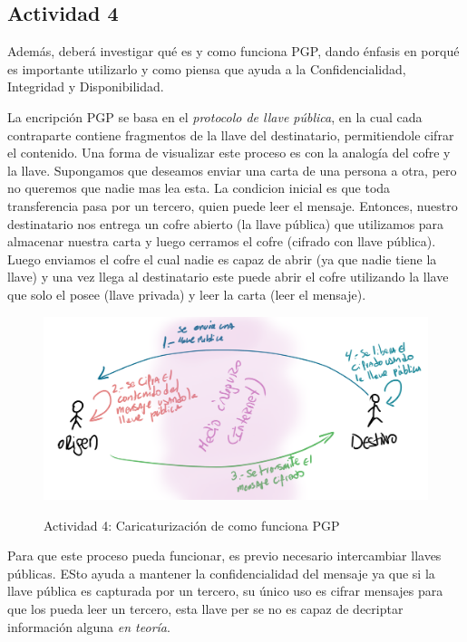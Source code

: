 \documentclass[11pt]{utalcaDoc}
\begin{document}
\subsection{Actividad 4}{Además, deberá investigar qué es y como funciona PGP, dando énfasis en porqué es importante utilizarlo y como piensa que ayuda a la Confidencialidad, Integridad y Disponibilidad.}

La encripción PGP se basa en el \textit{protocolo de llave pública}, en la cual cada contraparte contiene fragmentos de la llave del destinatario, permitiendole cifrar el contenido. Una forma de visualizar este proceso es con la analogía del cofre y la llave. Supongamos que deseamos enviar una carta de una persona a otra, pero no queremos que nadie mas lea esta. La condicion inicial es que toda transferencia pasa por un tercero, quien puede leer el mensaje. Entonces, nuestro destinatario nos entrega un cofre abierto (la llave pública) que utilizamos para almacenar nuestra carta y luego cerramos el cofre (cifrado con llave pública). Luego enviamos el cofre el cual nadie es capaz de abrir (ya que nadie tiene la llave) y una vez llega al destinatario este puede abrir el cofre utilizando la llave que solo el posee (llave privada) y leer la carta (leer el mensaje).


\begin{figure}[ht]
	\centering
	\includegraphics[width=.8\textwidth]{images/pgp}\\
	\caption{Actividad 4: Caricaturización de como funciona PGP}
	\label{FIG:caricatura}
\end{figure}

Para que este proceso pueda funcionar, es previo necesario intercambiar llaves públicas. ESto ayuda a mantener la confidencialidad del mensaje ya que si la llave pública es capturada por un tercero, su único uso es cifrar mensajes para que los pueda leer un tercero, esta llave per se no es capaz de decriptar información alguna \textit{en teoría}.\cite{REF:pgp}
\end{document}
